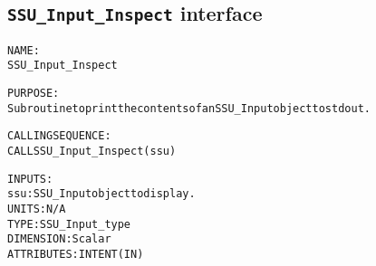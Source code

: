 \subsection{\texttt{SSU\_Input\_Inspect} interface}
  \label{sec:SSU_Input_Inspect_interface}
  \begin{alltt}
 
  NAME:
        SSU_Input_Inspect
 
  PURPOSE:
        Subroutine to print the contents of an SSU_Input object to stdout.
 
  CALLING SEQUENCE:
        CALL SSU_Input_Inspect( ssu )
 
  INPUTS:
        ssu:           SSU_Input object to display.
                       UNITS:      N/A
                       TYPE:       SSU_Input_type
                       DIMENSION:  Scalar
                       ATTRIBUTES: INTENT(IN)
 
  \end{alltt}
